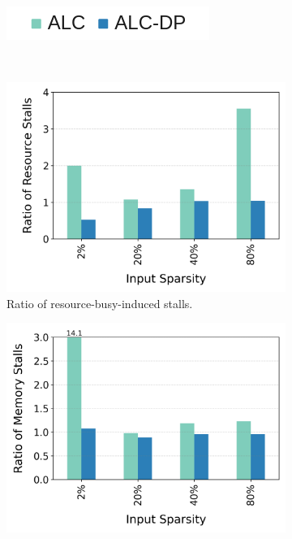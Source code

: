 \begin{figure}[h!]
  \centering
 \begin{subfigure}{4cm}
    \centering
    \includegraphics[width=\textwidth]{Figures/Evaluations/Legend.png}
 \end{subfigure}\\
  \begin{subfigure}{.5\textwidth}
    \centering
    \includegraphics[width=\textwidth, height=.28\textheight]{Figures/Evaluations/single_if_few_scatter_resource_stalls.png}
    \caption{Ratio of resource-busy-induced stalls.}
    \label{fig:single-if-few-scatter-resource-stalls}
  \end{subfigure}%
  \begin{subfigure}{.5\textwidth}
        \centering
    \includegraphics[width=\textwidth, height=.28\textheight]{Figures/Evaluations/single_if_few_scatter_mem_stalls.png}

\end{subfigure}
\end{figure}
